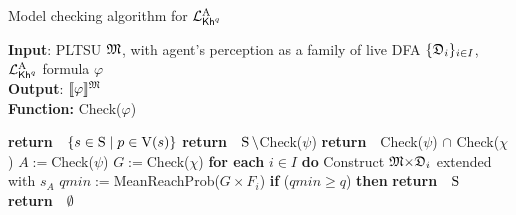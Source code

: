 \renewcommand{\Check}[1]{Check(#1)}%
\newcommand{\MinReachProb}[1]{MeanReachProb(#1)}%
\newcommand{\Return}{\!\textbf{return}\ \ }
\begin{algorithm}[tb]
  \caption{Model checking algorithm for $\PKhadapt$}
  \label{alg:mc:pkhadapt}
  \footnotesize
  \textbf{Input}: PLTSU $\model$, with agent's perception as a family of live DFA $\{\dfa_i\}_{i\in I}$, $\PKhadapt$ formula $\varphi$\\
  \textbf{Output}: $\truthset{\model}{\varphi}$ \\
  \textbf{Function:} \Check{$\varphi$} 
  \begin{algorithmic}[1] %
    \SWITCH {$\varphi$}
      {\Return {$\{{s\in\S}\mid {p\in\V(s)}\}$}}
    \CASELINE{${\neg\psi}$}
      {\Return{$\S\setminus{}$\Check{$\psi$}}}
    \CASELINE{${\psi\wedge\chi}$}
      {\Return{\Check{$\psi$} $\cap$ \Check{$\chi$}}}
          \STATE \quad\quad $A:={}$\Check{$\psi$}
          \STATE \quad\quad $G:={}$\Check{$\chi$}
          \STATE \quad\quad \textbf{for each} {$i\in I$} \textbf{do} 
              \STATE \quad\quad\quad  Construct $\model{\times}\dfa_i$ extended with $s_A$\;
              \STATE \quad\quad\quad $\mathit{qmin}:={}$\MinReachProb{$G{\times}F_i$}\;
              \STATE \quad\quad\quad \textbf{if} {($\mathit{qmin}\geq q$)} \textbf{then}  {\Return{$\S$}}\label{alg:ln:rettrue}
              \STATE \quad\quad \Return{$\emptyset$}\label{alg:ln:retfalse}
  \end{algorithmic}
  \end{algorithm}





